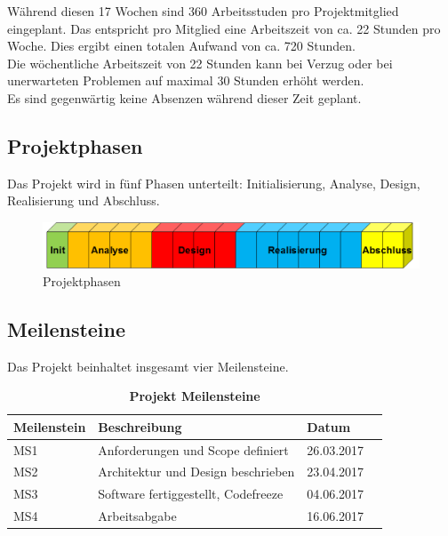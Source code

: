 \noindent Während diesen 17 Wochen sind 360 Arbeitsstuden pro Projektmitglied eingeplant. Das entspricht pro Mitglied eine Arbeitszeit von ca. 22 Stunden pro Woche. Dies ergibt einen totalen Aufwand von ca. 720 Stunden.\\

\noindent Die wöchentliche Arbeitszeit von 22 Stunden kann bei Verzug oder bei unerwarteten Problemen auf maximal 30 Stunden erhöht werden. \\

\noindent Es sind gegenwärtig keine Absenzen während dieser Zeit geplant.

\subsection{Projektphasen}
Das Projekt wird in fünf Phasen unterteilt: Initialisierung, Analyse, Design, Realisierung und Abschluss.
\newline
\begin{figure}[H]
\centering
\includegraphics[width=1\textwidth]{../01_Projektplanung/images/phasen.png}
\caption{Projektphasen}
\end{figure}
\subsection{Meilensteine}
Das Projekt beinhaltet insgesamt vier Meilensteine. \\
\begin{table}[H]
    \begin{tabular}{@{} l l l r@{}}\toprule    
    {Meilenstein} & {Beschreibung} & {Datum}\\ \midrule
    MS1 & Anforderungen und Scope definiert  & 26.03.2017\\ \addlinespace
    MS2 & Architektur und Design beschrieben & 23.04.2017\\ \addlinespace
    MS3 & Software fertiggestellt, Codefreeze  & 04.06.2017\\ \addlinespace
    MS4 & Arbeitsabgabe & 16.06.2017\\ 
    \bottomrule
    \end{tabular}
\caption{\textbf{Projekt Meilensteine}}
\end{table}
\newpage
